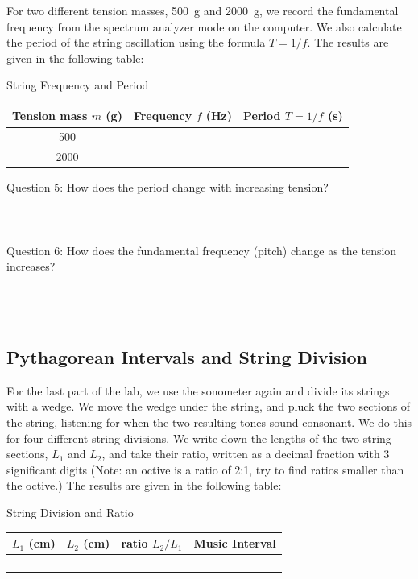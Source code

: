 \documentclass[11pt]{NSF}
\begin{document}
For two different tension masses, 500~g and 2000~g, we record the 
fundamental frequency from the spectrum analyzer mode on the computer.
We also calculate the period of the string oscillation using the 
formula $T= 1/f$.
The results are given in the following table:
%
\begin{table}[hbtp]
\begin{center}
String Frequency and Period\\
\begin{tabular}{| c | c | c | }
\hline
Tension mass $m$ (g) & Frequency $f$ (Hz) & Period $T=1/f$ (s) \\
\hline
500 &  &  \\
\hline
2000 &  &  \\
\hline
\end{tabular}
\label{t:1}
\end{center}
\end{table}
%

Question 5: \hspace{.5cm} How does the period change with increasing tension? 
\\
\\
\\
\\

Question 6: \hspace{.5cm} How does the fundamental frequency (pitch) change as the tension 
increases?
\\
\\
\\
\\

\subsection{Pythagorean Intervals and String Division}

For the last part of the lab, we use the sonometer again and 
divide its strings with a wedge.
We move the wedge under the string, and pluck the two sections 
of the string, listening for when the two resulting tones sound consonant.
We do this for four different string divisions.
We write down the lengths of the two string sections, $L_1$ and 
$L_2$, and take their ratio, written as a decimal fraction with 
3 significant digits (Note: an octive is a ratio of 2:1, try to find ratios smaller than the octive.)
The results are given in the following table:
%
\begin{table}[h!btp]
\begin{center}
String Division and Ratio\\
\begin{tabular}{| c | c | c | c | }
\hline
$L_1$ (cm) & $L_2$ (cm) & ratio $L_2/L_1$ & Music Interval\\
\hline
 &  &  & \\
\hline
 &  &  & \\
\hline
 &  &  & \\
\hline
 &  &  & \\
\hline
\end{tabular}
\label{t:4}
\end{center}
\end{table}
%
\end{document}
